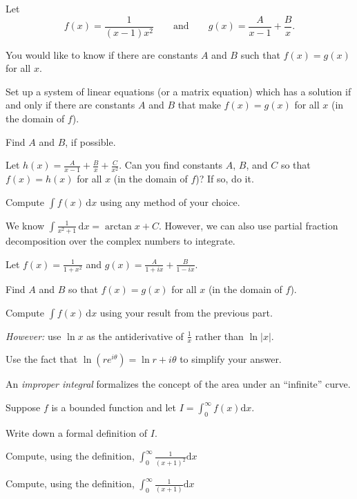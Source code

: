 \documentclass{workbook}
\begin{document}
\begin{slide}
	\question
	Let
		\[
			f(x)=\frac{1}{(x-1)x^2}\qquad
			\text{and}
			\qquad g(x)=\frac{A}{x-1}+\frac{B}{x}.
		\]

	\begin{parts}
		\item
		You would like to know if
		there are constants $A$ and $B$ such that $f(x)=g(x)$ for all $x$.

		Set up a system of linear equations (or a matrix equation) which has a
		solution if and only if there are constants $A$ and $B$ that make $f(x)=g(x)$ for all $x$ (in the domain of $f$).
		\item Find $A$ and $B$, if possible.
		\item Let $h(x)=\frac{A}{x-1}+\frac{B}{x}+\frac{C}{x^2}$. Can you find 
		constants $A$, $B$, and $C$ so that $f(x)=h(x)$ for all $x$ (in the domain of $f$)? If so, do it.
		\item Compute $\displaystyle \int f(x)\,\mathrm d x$ using any method of your choice.
	\end{parts}
\end{slide}

\begin{slide}
	\question
	We know $\int \frac{1}{x^2+1}\,\mathrm d x = \arctan x + C$. However, we can 
	also use partial fraction decomposition over the complex numbers to integrate.

	Let $f(x)=\frac{1}{1+x^2}$ and $g(x)=\frac{A}{1+ix}+\frac{B}{1-ix}$.

	\begin{parts}
		\item Find $A$ and $B$ so that $f(x)=g(x)$ for all $x$ (in the domain of $f$).
		\item Compute $\displaystyle \int f(x)\,\mathrm d x$ using your result from the previous part.

		\emph{However:} use $\ln x$ as the antiderivative of $\frac{1}{x}$ rather
		than $\ln |x|$.
		\item Use the fact that $\ln (re^{i\theta})=\ln r + i\theta$ to simplify your answer.
	\end{parts}
\end{slide}


\begin{slide}
	\question
	An \emph{improper integral} formalizes the concept of the area 
	under an ``infinite'' curve.

	Suppose $f$ is a bounded function and let $\displaystyle I=\int_0^\infty f(x)\mathrm d x$.

	\begin{parts}
		\item Write down a formal definition of $I$.
		\item Compute, using the definition, 
		$\displaystyle \int_0^\infty \frac{1}{(x+1)^2}\mathrm d x$
		\item Compute, using the definition, 
		$\displaystyle \int_0^\infty \frac{1}{(x+1)}\mathrm d x$
	\end{parts}
\end{slide}
\end{document}
